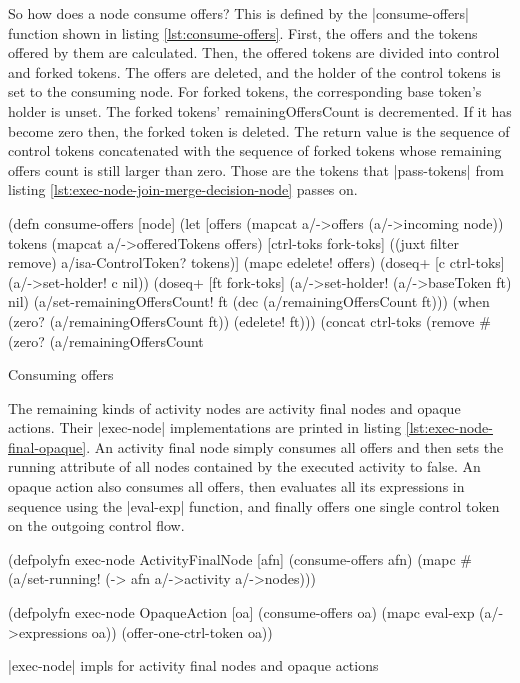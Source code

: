 \documentclass[submission]{eptcs}
\newcommand{\code}{\clojureinline}
\begin{document}
So how does a node consume offers?  This is defined by the
\code|consume-offers| function shown in listing \vref{lst:consume-offers}.
First, the offers and the tokens offered by them are calculated.  Then, the
offered tokens are divided into control and forked tokens.  The offers are
deleted, and the holder of the control tokens is set to the consuming node.
For forked tokens, the corresponding base token's holder is unset.  The forked
tokens' \textsf{remainingOffersCount} is decremented.  If it has become zero
then, the forked token is deleted.  The return value is the sequence of control
tokens concatenated with the sequence of forked tokens whose remaining offers
count is still larger than zero.  Those are the tokens that \code|pass-tokens|
from listing \vref{lst:exec-node-join-merge-decision-node} passes on.

\begin{listing}[h!tb]
\begin{clojurecode}
(defn consume-offers [node]
  (let [offers (mapcat a/->offers (a/->incoming node))
        tokens (mapcat a/->offeredTokens offers)
        [ctrl-toks fork-toks] ((juxt filter remove) a/isa-ControlToken? tokens)]
    (mapc edelete! offers)
    (doseq+ [c ctrl-toks] (a/->set-holder! c nil))
    (doseq+ [ft fork-toks]
      (a/->set-holder! (a/->baseToken ft) nil)
      (a/set-remainingOffersCount! ft (dec (a/remainingOffersCount ft)))
      (when (zero? (a/remainingOffersCount ft))
        (edelete! ft)))
    (concat ctrl-toks (remove #(zero? (a/remainingOffersCount %
\end{clojurecode}
\caption{Consuming offers}
\label{lst:consume-offers}
\end{listing}

The remaining kinds of activity nodes are activity final nodes and opaque
actions.  Their \code|exec-node| implementations are printed in listing
\vref{lst:exec-node-final-opaque}.  An activity final node simply consumes all
offers and then sets the \textsf{running} attribute of all nodes contained by
the executed activity to false.  An opaque action also consumes all offers,
then evaluates all its expressions in sequence using the \code|eval-exp|
function, and finally offers one single control token on the outgoing control
flow.

\begin{listing}[h!tb]
\begin{clojurecode}
(defpolyfn exec-node ActivityFinalNode [afn]
  (consume-offers afn)
  (mapc #(a/set-running! %
        (-> afn a/->activity a/->nodes)))

(defpolyfn exec-node OpaqueAction [oa]
  (consume-offers oa)
  (mapc eval-exp (a/->expressions oa))
  (offer-one-ctrl-token oa))
\end{clojurecode}
\caption{\code|exec-node| impls for activity final nodes and opaque actions}
\label{lst:exec-node-final-opaque}
\end{listing}
\end{document}
